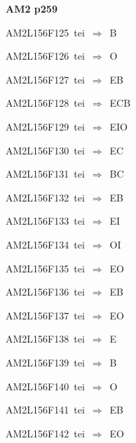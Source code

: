\par\vfill\eject
{\bf\hfill AM2 p259\hfill\hbox{}}\par\bigskip
{\sixrm AM2L156F125\ {\sixit tei}\ }$\Rightarrow$\ B\par\smallskip
{\sixrm AM2L156F126\ {\sixit tei}\ }$\Rightarrow$\ O\par\smallskip
{\sixrm AM2L156F127\ {\sixit tei}\ }$\Rightarrow$\ EB\par\smallskip
{\sixrm AM2L156F128\ {\sixit tei}\ }$\Rightarrow$\ ECB\par\smallskip
{\sixrm AM2L156F129\ {\sixit tei}\ }$\Rightarrow$\ EIO\par\smallskip
{\sixrm AM2L156F130\ {\sixit tei}\ }$\Rightarrow$\ EC\par\smallskip
{\sixrm AM2L156F131\ {\sixit tei}\ }$\Rightarrow$\ BC\par\smallskip
{\sixrm AM2L156F132\ {\sixit tei}\ }$\Rightarrow$\ EB\par\smallskip
{\sixrm AM2L156F133\ {\sixit tei}\ }$\Rightarrow$\ EI\par\smallskip
{\sixrm AM2L156F134\ {\sixit tei}\ }$\Rightarrow$\ OI\par\smallskip
{\sixrm AM2L156F135\ {\sixit tei}\ }$\Rightarrow$\ EO\par\smallskip
{\sixrm AM2L156F136\ {\sixit tei}\ }$\Rightarrow$\ EB\par\smallskip
{\sixrm AM2L156F137\ {\sixit tei}\ }$\Rightarrow$\ EO\par\smallskip
{\sixrm AM2L156F138\ {\sixit tei}\ }$\Rightarrow$\ E\par\smallskip
{\sixrm AM2L156F139\ {\sixit tei}\ }$\Rightarrow$\ B\par\smallskip
{\sixrm AM2L156F140\ {\sixit tei}\ }$\Rightarrow$\ O\par\smallskip
{\sixrm AM2L156F141\ {\sixit tei}\ }$\Rightarrow$\ EB\par\smallskip
{\sixrm AM2L156F142\ {\sixit tei}\ }$\Rightarrow$\ EO\par\smallskip

